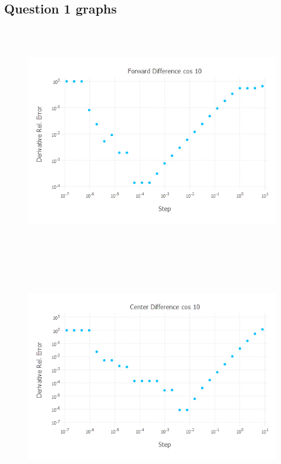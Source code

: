 \documentclass{article}
\begin{document}
\subsection*{Question 1 graphs}
\begin{figure}[H]
	\includegraphics[width=6in,height=4in]{"forward cos 10"}
\end{figure}
\begin{figure}[H]
	\includegraphics[width=6in,height=4in]{"center cos 10"}
\end{figure}
\end{document}

